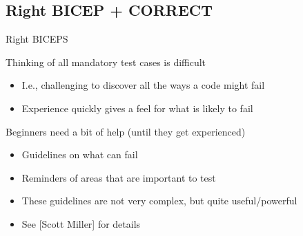 \subsection{Right BICEP + CORRECT}
\begin{frame}{Right BICEPS}
  \begin{block}{Thinking of all mandatory test cases is difficult}
    \begin{itemize}
    \item I.e., challenging to discover all the ways a code might fail
    \item {} Experience quickly gives a feel for what is likely to fail
    \end{itemize}
  \end{block}

  \begin{block}{Beginners need a bit of help  (until they get experienced)}
    \begin{itemize}
    \item Guidelines on what can fail
    \item Reminders of areas that are important to test
    \item These guidelines are not very complex, but quite useful/powerful
    \item See  [Scott Miller] for details
    \end{itemize}
  \end{block}
\end{frame}

